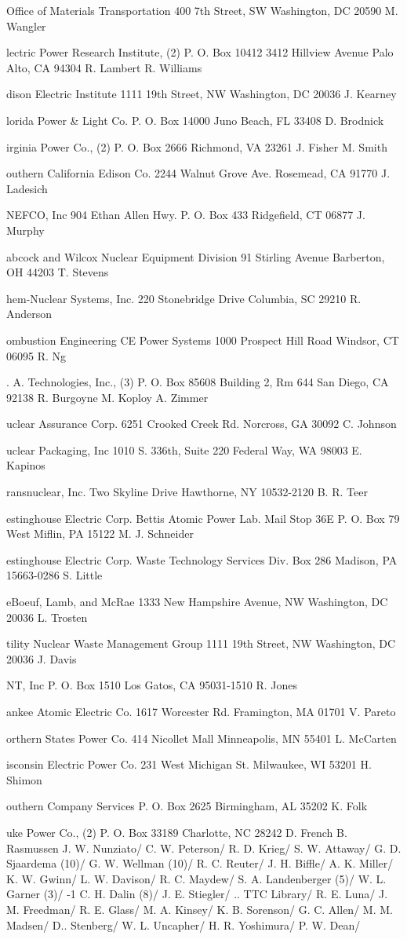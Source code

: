 \begin{flushleft}
Office of Materials Transportation
400 7th Street, SW
Washington, DC 20590
\name
M. Wangler
\address
Electric Power Research Institute, (2)
P. O. Box 10412
3412 Hillview Avenue
Palo Alto, CA 94304
\name
R. Lambert
R. Williams
\address
Edison Electric Institute
1111 19th Street, NW
Washington, DC 20036
\name
J. Kearney
\address
Florida Power \& Light Co.
P. O. Box 14000
Juno Beach, FL 33408
\name
D. Brodnick
\address
Virginia Power Co., (2)
P. O. Box 2666
Richmond, VA 23261
\name
J. Fisher
M. Smith
\address
Southern California Edison Co.
2244 Walnut Grove Ave.
Rosemead, CA 91770
\name
J. Ladesich
\address
ANEFCO, Inc
904 Ethan Allen Hwy.
P. O. Box 433
Ridgefield, CT 06877
\name
J. Murphy
\address
Babcock and Wilcox
Nuclear Equipment Division
91 Stirling Avenue
Barberton, OH 44203
\name
T. Stevens
\address
Chem-Nuclear Systems, Inc.
220 Stonebridge Drive
Columbia, SC 29210
\name
R. Anderson
\address
Combustion Engineering
CE Power Systems
1000 Prospect Hill Road
Windsor, CT 06095
\name
R. Ng
\address
G. A. Technologies, Inc., (3)
P. O. Box 85608
Building 2, Rm 644
San Diego, CA 92138
\name
R. Burgoyne
M. Koploy
A. Zimmer
\address
Nuclear Assurance Corp.
6251 Crooked Creek Rd.
Norcross, GA 30092
\name
C. Johnson
\address
Nuclear Packaging, Inc
1010 S. 336th, Suite 220
Federal Way, WA 98003
\name
E. Kapinos
\address
Transnuclear, Inc.
Two Skyline Drive
Hawthorne, NY 10532-2120
\name
B. R. Teer
\address
Westinghouse Electric Corp.
Bettis Atomic Power Lab.
Mail Stop 36E
P. O. Box 79
West Miflin, PA 15122
\name
M. J. Schneider
\address
Westinghouse Electric Corp.
Waste Technology Services Div.
Box 286
Madison, PA 15663-0286
\name
S. Little
\address
LeBoeuf, Lamb, and McRae
1333 New Hampshire Avenue, NW
Washington, DC 20036
\name
L. Trosten
\address
Utility Nuclear Waste Management Group
1111 19th Street, NW
Washington, DC 20036
\name
J. Davis
\address
JNT, Inc
P. O. Box 1510
Los Gatos, CA 95031-1510
\name
R. Jones
\address
Yankee Atomic Electric Co.
1617 Worcester Rd.
Framington, MA 01701
\name
V. Pareto
\address
Northern States Power Co.
414 Nicollet Mall
Minneapolis, MN 55401
\name
L. McCarten
\address
Wisconsin Electric Power Co.
231 West Michigan St.
Milwaukee, WI 53201
\name
H. Shimon
\address
Southern Company Services
P. O. Box 2625
Birmingham, AL 35202
\name
K. Folk
\address
Duke Power Co., (2)
P. O. Box 33189
Charlotte, NC 28242
\name
D. French
B. Rasmussen
\SanInt
{}  J. W. Nunziato/
  C. W. Peterson/
 R. D. Krieg/
 S. W. Attaway/
 G. D. Sjaardema (10)/
 G. W. Wellman (10)/
 R. C. Reuter/
 J. H. Biffle/
 A. K. Miller/
 K. W. Gwinn/
  L. W. Davison/
  R. C. Maydew/
 S. A. Landenberger (5)/
 W. L. Garner (3)/
-1 C. H. Dalin (8)/
 J. E. Stiegler/
 .. TTC Library/
 R. E. Luna/
 J. M. Freedman/
 R. E. Glass/
 M. A. Kinsey/
 K. B. Sorenson/
 G. C. Allen/
 M. M. Madsen/
 D.. Stenberg/
 W. L. Uncapher/
 H. R. Yoshimura/
 P. W. Dean/
\end{flushleft}


